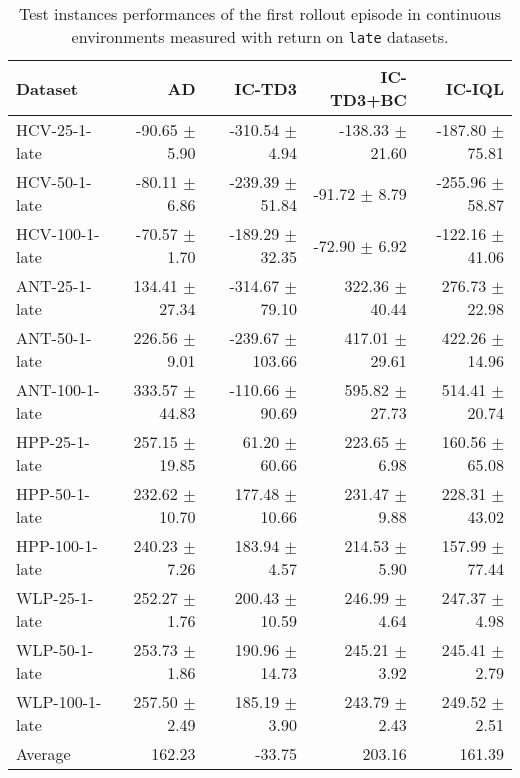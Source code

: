 \begin{table}[ht]
    \label{tab:}
    \begin{center}
    \caption{Test instances performances of the first rollout episode in continuous environments measured with return on \texttt{late} datasets.}
    \begin{small}
    \begin{adjustbox}{max width=\columnwidth}
		\begin{tabular}{l|rrrr}
		\toprule
	\textbf{Dataset} & \textbf{AD} & \textbf{IC-TD3} & \textbf{IC-TD3+BC} & \textbf{IC-IQL}\\
\midrule
HCV-25-1-late & -90.65 $\pm$ 5.90 & -310.54 $\pm$ 4.94 & -138.33 $\pm$ 21.60 & -187.80 $\pm$ 75.81\\
HCV-50-1-late & -80.11 $\pm$ 6.86 & -239.39 $\pm$ 51.84 & -91.72 $\pm$ 8.79 & -255.96 $\pm$ 58.87\\
HCV-100-1-late & -70.57 $\pm$ 1.70 & -189.29 $\pm$ 32.35 & -72.90 $\pm$ 6.92 & -122.16 $\pm$ 41.06\\
ANT-25-1-late & 134.41 $\pm$ 27.34 & -314.67 $\pm$ 79.10 & 322.36 $\pm$ 40.44 & 276.73 $\pm$ 22.98\\
ANT-50-1-late & 226.56 $\pm$ 9.01 & -239.67 $\pm$ 103.66 & 417.01 $\pm$ 29.61 & 422.26 $\pm$ 14.96\\
ANT-100-1-late & 333.57 $\pm$ 44.83 & -110.66 $\pm$ 90.69 & 595.82 $\pm$ 27.73 & 514.41 $\pm$ 20.74\\
HPP-25-1-late & 257.15 $\pm$ 19.85 & 61.20 $\pm$ 60.66 & 223.65 $\pm$ 6.98 & 160.56 $\pm$ 65.08\\
HPP-50-1-late & 232.62 $\pm$ 10.70 & 177.48 $\pm$ 10.66 & 231.47 $\pm$ 9.88 & 228.31 $\pm$ 43.02\\
HPP-100-1-late & 240.23 $\pm$ 7.26 & 183.94 $\pm$ 4.57 & 214.53 $\pm$ 5.90 & 157.99 $\pm$ 77.44\\
WLP-25-1-late & 252.27 $\pm$ 1.76 & 200.43 $\pm$ 10.59 & 246.99 $\pm$ 4.64 & 247.37 $\pm$ 4.98\\
WLP-50-1-late & 253.73 $\pm$ 1.86 & 190.96 $\pm$ 14.73 & 245.21 $\pm$ 3.92 & 245.41 $\pm$ 2.79\\
WLP-100-1-late & 257.50 $\pm$ 2.49 & 185.19 $\pm$ 3.90 & 243.79 $\pm$ 2.43 & 249.52 $\pm$ 2.51\\
\midrule
Average & 162.23 & -33.75 & 203.16 & 161.39\\
\end{tabular}
        \end{adjustbox}
    \end{small}
    \end{center}
    \vskip -0.1in
\end{table}
    